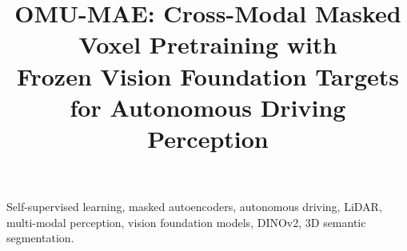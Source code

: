 \documentclass[conference]{IEEEtran}
\newif\ifanon \anonfalse
\begin{document}
\title{OMU-MAE: Cross-Modal Masked Voxel Pretraining with\\
Frozen Vision Foundation Targets for Autonomous Driving Perception}

\ifanon
  \author{\IEEEauthorblockN{Anonymous IV submission}
  \IEEEauthorblockA{Paper ID XXXX}}
\else
  \author{%
  }
\fi

\maketitle

\begin{abstract}

\end{abstract}

\begin{IEEEkeywords}
Self-supervised learning, masked autoencoders, autonomous driving,
LiDAR, multi-modal perception, vision foundation models, DINOv2,
3D semantic segmentation.
\end{IEEEkeywords}












\end{document}
